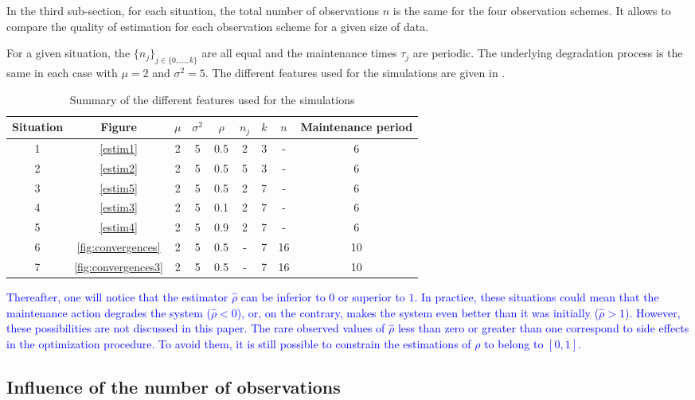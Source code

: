 In the third sub-section, for each situation, the total number of observations $n$ is the same for the four observation schemes.  It allows to compare the quality of estimation for each observation scheme for a given size of data.


For a given situation, the $\{n_j\}_{j\in \{0,...,k\}}$ are all equal and the maintenance times $\tau_j$ are periodic.
The underlying degradation process is the same in each case with $\mu=2$ and $\sigma^2=5$.
The different features used for the simulations are given  in \mbox{}. 



\begin{table} [!h]
\caption{Summary of the different features used for the simulations}
\centering
\label{table:para}
\begin{tabular}{|c|c|c|c|c|c|c|c|c|}
\hline
Situation & Figure& $\mu$ & $\sigma^2$ & $\rho$ & $n_j$ & $k$ & $n$  & Maintenance period\\
\hline
1&\ref{estim1} & 2&5&0.5&2&3&-&6\\
2&\ref{estim2}&2 &5 &0.5 &5 &3&-&6  \\
3&\ref{estim5} &2&5&0.5&2&7&-&6\\
4&\ref{estim3}&2 &5 &0.1 &2 &7&-&6 \\
5&\ref{estim4} &2 & 5& 0.9& 2& 7&-&6\\
6&\ref{fig:convergences} &2&5&0.5&-&7&16&10\\
7&\ref{fig:convergences3}&2&5&0.5&-&7&16&10\\
\hline
\end{tabular}
\end{table}

\textcolor{blue}{Thereafter, one will notice that the estimator $\hat \rho$ can be inferior to $0$ or superior to $1$. In practice, these situations could mean that the maintenance action degrades the system ($\hat \rho<0$), or, on the contrary, makes the system even better than it was initially ($\hat \rho>1$). However, these possibilities are not discussed in this paper. The rare observed values of $\hat{\rho}$ less than zero or greater than one correspond to side effects in the optimization procedure. To avoid them, it is still possible to constrain the estimations of $ \rho $ to belong to $[0,1]$. }




\subsection{Influence of the number of observations}


